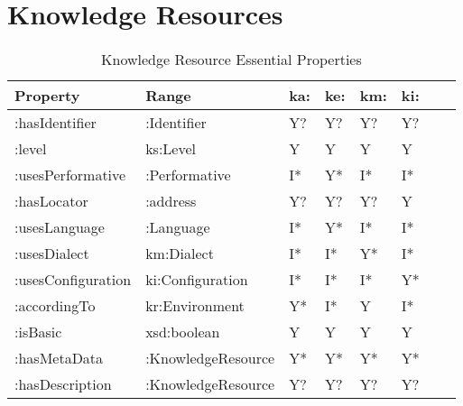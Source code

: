 \documentclass[runningheads]{llncs}
\begin{document}
\section{Knowledge Resources}
\begin{table}[h]
\begin{tabular}{|l|l|l|l|l|l|l|l|}
\hline
\textbf{Property}  & \textbf{Range}     
& \textbf{ka:}
& \textbf{ke:}
& \textbf{km:}
& \textbf{ki:}
\\ \hline
:hasIdentifier      & :Identifier        & Y?                & Y?                     & Y?             & Y?               \\ \hline
:level              & ks:Level           & Y                 & Y                      & Y              & Y                \\ \hline
:usesPerformative   & :Performative      & I*                & Y*                     & I*              & I*                \\ \hline
:hasLocator         & :address           & Y?                & Y?                     & Y?             & Y                \\ \hline
:usesLanguage       & :Language       & I*                & Y*                     & I*             & I*               \\ \hline
:usesDialect        & km:Dialect        & I*                 & I*                      & Y*             & I*               \\ \hline
:usesConfiguration  & ki:Configuration   & I*                 & I*                      & I*            & Y*               \\ \hline
:accordingTo        & kr:Environment  & Y*                 & I*                      & Y              & I*                \\ \hline
:isBasic            & xsd:boolean        & Y                 & Y                      & Y              & Y                \\ \hline
:hasMetaData        & :KnowledgeResource & Y*                & Y*                     & Y*             & Y*               \\ \hline
:hasDescription   & :KnowledgeResource       & Y?                & Y?                     & Y?             & Y?   \\ \hline           
\end{tabular}
\caption{Knowledge Resource Essential Properties}
\label{kronto}
\end{table}
\end{document}
